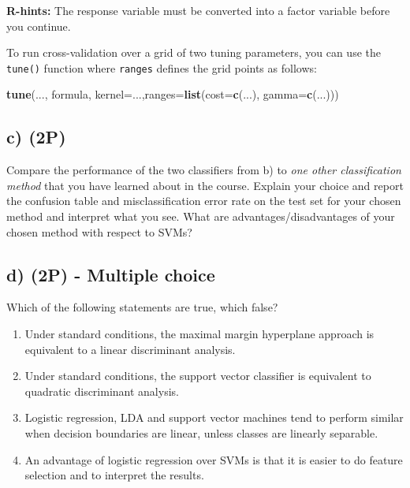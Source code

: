 \documentclass[]{article}
\newenvironment{Shaded}{\begin{snugshade}}{\end{snugshade}}
\newcommand{\DataTypeTok}[1]{\textcolor[rgb]{0.13,0.29,0.53}{#1}}
\newcommand{\KeywordTok}[1]{\textcolor[rgb]{0.13,0.29,0.53}{\textbf{#1}}}
\newcommand{\NormalTok}[1]{#1}
\newcommand{\OperatorTok}[1]{\textcolor[rgb]{0.81,0.36,0.00}{\textbf{#1}}}
\newcommand{\StringTok}[1]{\textcolor[rgb]{0.31,0.60,0.02}{#1}}
\providecommand{\tightlist}{%
  \setlength{\itemsep}{0pt}\setlength{\parskip}{0pt}}
\begin{document}
\textbf{R-hints:} The response variable must be converted into a factor
variable before you continue.

\begin{Shaded}
\end{Shaded}

To run cross-validation over a grid of two tuning parameters, you can
use the \texttt{tune()} function where \texttt{ranges} defines the grid
points as follows:

\begin{Shaded}
\begin{Highlighting}[]
\KeywordTok{tune}\NormalTok{(..., formula, }\DataTypeTok{kernel=}\NormalTok{...,}\DataTypeTok{ranges=}\KeywordTok{list}\NormalTok{(}\DataTypeTok{cost=}\KeywordTok{c}\NormalTok{(...), }\DataTypeTok{gamma=}\KeywordTok{c}\NormalTok{(...)))}
\end{Highlighting}
\end{Shaded}

\hypertarget{c-2p-2}{%
\subsection{c) (2P)}\label{c-2p-2}}

Compare the performance of the two classifiers from b) to \emph{one
other classification method} that you have learned about in the course.
Explain your choice and report the confusion table and misclassification
error rate on the test set for your chosen method and interpret what you
see. What are advantages/disadvantages of your chosen method with
respect to SVMs?

\hypertarget{d-2p---multiple-choice}{%
\subsection{d) (2P) - Multiple choice}\label{d-2p---multiple-choice}}

Which of the following statements are true, which false?

\begin{enumerate}
\def\labelenumi{(\roman{enumi})}
\tightlist
\item
  Under standard conditions, the maximal margin hyperplane approach is
  equivalent to a linear discriminant analysis.
\item
  Under standard conditions, the support vector classifier is equivalent
  to quadratic discriminant analysis.
\item
  Logistic regression, LDA and support vector machines tend to perform
  similar when decision boundaries are linear, unless classes are
  linearly separable.
\item
  An advantage of logistic regression over SVMs is that it is easier to
  do feature selection and to interpret the results.
\end{enumerate}
\end{document}
